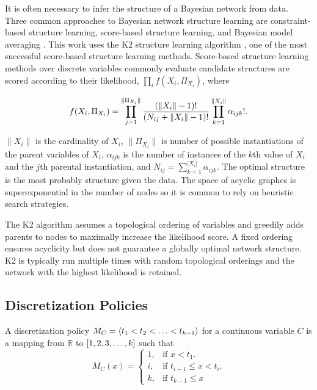 It is often necessary to infer the structure of a Bayesian network from data.
Three common approaches to Bayesian network structure learning are constraint-based structure learning, score-based structure learning, and Bayesian model averaging \citep[see][chap.~18]{PGM_2009}. This work uses the K2 structure learning algorithm \citep{K2}, one of the most successful score-based structure learning methods.
Score-based structure learning methods over discrete variables commonly evaluate candidate structures are scored according to their likelihood, $\prod_i f(X_i, \Pi_{X_i})$, where

\begin{align}
\label{eq:f_x_p}
f(X_i, \Pi_{X_i}) = \prod_{j=1}^{\|\Pi_{X_i}\|} {{(\|X_i\|-1)!}\over{(N_{ij} + \|X_i\|-1)!}} \prod_{k=1}^{\|X_i\|} \alpha_{ijk}!\text{.}
\end{align}

\noindent
$\|X_i\|$ is the cardinality of $X_i$, $\|\Pi_{X_i}\|$ is number of possible instantiations of the parent variables of $X_i$, $\alpha_{ijk}$ is the number of instances of the $k$th value of $X_i$ and the $j$th parental instantiation, and $N_{ij} = \sum_{k=1}^{|X_i|} \alpha_{ijk}$.
The optimal structure is the most probably structure given the data.
The space of acyclic graphcs is superexponential in the number of nodes \citep{PGM_2009} so it is common to rely on heuristic search strategies.

The K2 algorithm assumes a topological ordering of variables and greedily adds parents to nodes to maximally increase the likelihood score.
A fixed ordering ensures acyclicity but does not guarantee a globally optimal network structure.
K2 is typically run multiple times with random topological orderings and the network with the highest likelihood is retained.

\subsection{Discretization Policies}

A discretization policy $M_C = \langle t_1 < t_2 < \ldots < t_{k-1} \rangle$ for a continuous variable $C$ is a mapping from $\mathbb{R}$ to $\brock{1,2,3,\ldots,k}$ such that
\begin{equation}
  M_C (x)=\begin{cases}
    1, & \text{if $x<t_1$}.\\
    i, & \text{if $t_{i-1} \leq x < t_i$}\text{.}\\
    k, & \text{if $t_{k-1} \leq x$}
  \end{cases}
\end{equation}

